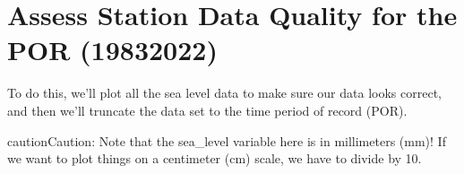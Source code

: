 \documentclass[letterpaper,10pt,english]{jupyterBook}
\begin{document}
\chapter{Assess Station Data Quality for the POR (1983\sphinxhyphen{}2022)}
\label{\detokenize{notebooks/FloodFrequency:assess-station-data-quality-for-the-por-1983-2022}}
\sphinxAtStartPar
To do this, we’ll plot all the sea level data to make sure our data looks correct, and then we’ll truncate the data set to the time period of record (POR).

\begin{sphinxShadowBox}

\begin{sphinxadmonition}{caution}{Caution:}
\sphinxAtStartPar
Note that the sea\_level variable here is in millimeters (mm)! If we want to plot things on a centimeter (cm) scale, we have to divide by 10.
\end{sphinxadmonition}
\end{sphinxShadowBox}
\end{document}
